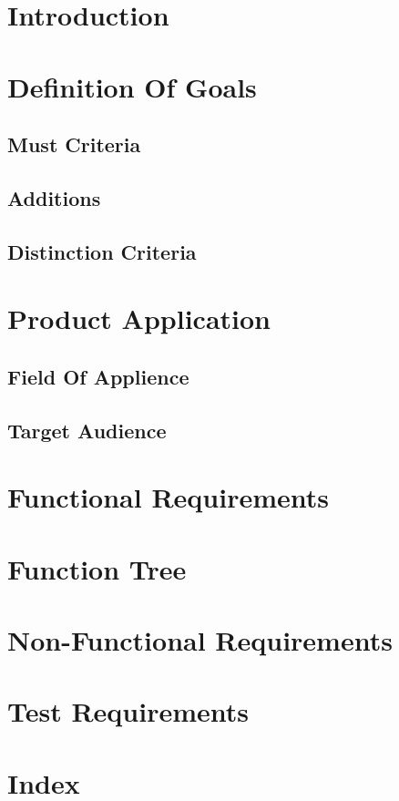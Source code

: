 \documentclass[10pt,a4paper,titlepage,twoside,german]{zhawreprt}
\begin{document}
\maketitle
\tableofcontents
\chapter{Introduction}\label{chp:Introduction}
\chapter{Definition Of Goals}\label{chp:DefinitionOfGoals}
\section{Must Criteria}\label{sec:MustCriteria}
\section{Additions}\label{sec:WishCriteria}
\section{Distinction Criteria}\label{sec:DistinctionCriteria}
\chapter{Product Application}\label{chp:ProductApplication}
\section{Field Of Applience}\label{sec:FieldOfApplience}
\section{Target Audience}\label{sec:TargetAudience}
\chapter{Functional Requirements}\label{chp:FunctionalRequirements}
\chapter{Function Tree}\label{chp:FunctionTree}
\chapter{Non-Functional Requirements}\label{chp:NonFunctionalRequirements}
\chapter{Test Requirements}\label{chp:TestRequirements}
\chapter{Index}\label{chp:Index}
\printglossary\label{sec:Glossary}
\newpage
\label{sec:Bibliography}
\end{document}
